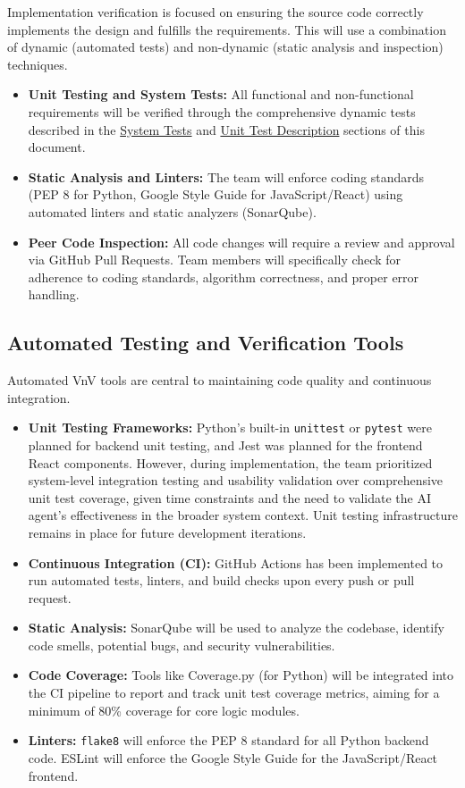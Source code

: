 \documentclass[12pt, titlepage]{article}
\begin{document}
Implementation verification is focused on ensuring the source code correctly implements the design and fulfills the requirements.
This will use a combination of dynamic (automated tests) and non-dynamic (static analysis and inspection) techniques.

\begin{itemize}
    \item \textbf{Unit Testing and System Tests:} All functional and non-functional requirements will be verified through the comprehensive dynamic tests described in the \hyperref[sec:srs-system]{System Tests} and \hyperref[sec:unit-test-description]{Unit Test Description} sections of this document.
    \item \textbf{Static Analysis and Linters:} The team will enforce coding standards (PEP 8 for Python, Google Style Guide for JavaScript/React) using automated linters and static analyzers (SonarQube).
    \item \textbf{Peer Code Inspection:} All code changes will require a review and approval via GitHub Pull Requests.
    Team members will specifically check for adherence to coding standards, algorithm correctness, and proper error handling.
\end{itemize}

\subsection{Automated Testing and Verification Tools}


Automated VnV tools are central to maintaining code quality and continuous integration.

\begin{itemize}
    \item \textbf{Unit Testing Frameworks:} Python's built-in \texttt{unittest} or \texttt{pytest} were planned for backend unit testing, and Jest was planned for the frontend React components. However, during implementation, the team prioritized system-level integration testing and usability validation over comprehensive unit test coverage, given time constraints and the need to validate the AI agent's effectiveness in the broader system context. Unit testing infrastructure remains in place for future development iterations.
    \item \textbf{Continuous Integration (CI):} GitHub Actions has been implemented to run automated tests, linters, and build checks upon every push or pull request.
    \item \textbf{Static Analysis:} SonarQube will be used to analyze the codebase, identify code smells, potential bugs, and security vulnerabilities.
    \item \textbf{Code Coverage:} Tools like Coverage.py (for Python) will be integrated into the CI pipeline to report and track unit test coverage metrics, aiming for a minimum of 80\% coverage for core logic modules.
    \item \textbf{Linters:} \texttt{flake8} will enforce the PEP 8 standard for all Python backend code. ESLint will enforce the Google Style Guide for the JavaScript/React frontend.
\end{itemize}
\end{document}
